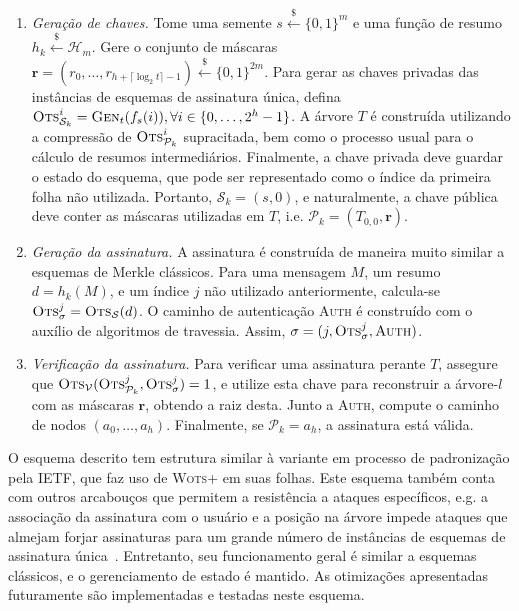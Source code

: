 \documentclass[12pt]{report}
\newcommand{\hh}{\mathcal{H}}
\newcommand{\pk}{\mathcal{P}_k}
\newcommand{\sk}{\mathcal{S}_k}
\newcommand{\binwds}[1]{\{0, 1\}^{#1}}
\begin{document}
\begin{enumerate}

  \item[] \emph{Geração de chaves.} Tome uma semente $s \stackrel{\$}{\longleftarrow} \binwds{m}$ e uma função de resumo $h_k \stackrel{\$}{\longleftarrow} \hh{}_m$. Gere o conjunto de máscaras $\mathbf{r} = (r_0, \dots, r_{h + \lceil \log_{2} t \rceil - 1}) \stackrel{\$}{\longleftarrow} \binwds{2m}$. Para gerar as chaves privadas das instâncias de esquemas de assinatura única, defina $\textsc{Ots}_{\sk{}}^{i} = \textsc{Gen}_t(f_s(i)), \forall i \in \{0, \dots, 2^h - 1\}$. A árvore $T$ é construída utilizando a compressão de $\textsc{Ots}_{\pk{}}^{i}$ supracitada, bem como o processo usual para o cálculo de resumos intermediários. Finalmente, a chave privada deve guardar o estado do esquema, que pode ser representado como o índice da primeira folha não utilizada. Portanto, $\sk{} = (s, 0)$, e naturalmente, a chave pública deve conter as máscaras utilizadas em $T$, i.e. $\pk{} = (T_{0,0}, \mathbf{r})$.
  
  \item[] \emph{Geração da assinatura.} A assinatura é construída de maneira muito similar a esquemas de Merkle clássicos. Para uma mensagem $M$, um resumo $d = h_k(M)$, e um índice $j$
  não utilizado anteriormente, calcula-se $\textsc{Ots}_\sigma^{j} = \textsc{Ots}_\mathcal{S}(d)$. O caminho de autenticação \textsc{Auth} é construído com o auxílio de algoritmos de travessia. Assim, $\sigma = (j, \textsc{Ots}_\sigma^{j}, \textsc{Auth})$.
  
  \item[] \emph{Verificação da assinatura.} Para verificar uma assinatura perante $T$, assegure que $\textsc{Ots}_{\mathcal{V}}(\textsc{Ots}_{\pk{}}^{j}, \textsc{Ots}_{\sigma}^{j}) = 1$, e utilize esta chave para reconstruir a árvore-$l$ com as máscaras $\mathbf{r}$, obtendo a raiz desta. Junto a \textsc{Auth}, compute o caminho de nodos $(a_0, \dots, a_h)$. Finalmente, se $\pk{} = a_{h}$, a assinatura está válida.

\end{enumerate}

O esquema descrito tem estrutura similar à variante em processo de padronização pela IETF, que faz uso de \textsc{Wots+} em suas folhas. Este esquema também conta com outros arcabouços que permitem a resistência a ataques específicos, e.g. a associação da assinatura com o usuário e a posição na árvore impede ataques que almejam forjar assinaturas para um grande número de instâncias de esquemas de assinatura única~\cite[9.1]{irtf-cfrg-xmss-hash-based-signatures-12}. Entretanto, seu funcionamento geral é similar a esquemas clássicos, e o gerenciamento de estado é mantido. As otimizações apresentadas futuramente são implementadas e testadas neste esquema. 
\end{document}
